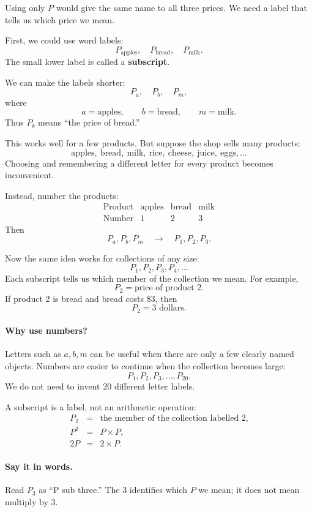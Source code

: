 	Using only $P$ would give the same name to all three prices. We need a label that tells us which price we mean.
	
	First, we could use word labels:
	\[
	P_{\text{apples}},\quad
	P_{\text{bread}},\quad
	P_{\text{milk}}.
	\]
	The small lower label is called a \textbf{subscript}.
	
	We can make the labels shorter:
	\[
	P_a,\quad P_b,\quad P_m,
	\]
	where
	\[
	a=\text{apples},\qquad
	b=\text{bread},\qquad
	m=\text{milk}.
	\]
	Thus $P_b$ means ``the price of bread.''
	
	This works well for a few products. But suppose the shop sells many products:
	\[
	\text{apples},\ \text{bread},\ \text{milk},\ \text{rice},\
	\text{cheese},\ \text{juice},\ \text{eggs},\ldots
	\]
	Choosing and remembering a different letter for every product becomes inconvenient.
	
	Instead, number the products:
	\[
	\begin{array}{c|ccc}
		\text{Product} & \text{apples} & \text{bread} & \text{milk} \\
		\hline
		\text{Number} & 1 & 2 & 3
	\end{array}
	\]
	Then
	\[
	P_a,P_b,P_m
	\quad\longrightarrow\quad
	P_1,P_2,P_3.
	\]
	
	Now the same idea works for collections of any size:
	\[
	P_1,P_2,P_3,P_4,\ldots
	\]
	Each subscript tells us which member of the collection we mean. For example,
	\[
	P_2=\text{price of product 2}.
	\]
	If product 2 is bread and bread costs \$3, then
	\[
	P_2=3\text{ dollars}.
	\]
	
	\paragraph{Why use numbers?}
	Letters such as $a,b,m$ can be useful when there are only a few clearly named objects. Numbers are easier to continue when the collection becomes large:
	\[
	P_1,P_2,P_3,\ldots,P_{20}.
	\]
	We do not need to invent 20 different letter labels.
	
	A subscript is a label, not an arithmetic operation:
	\[
	\begin{array}{ccl}
		P_2 & = & \text{the member of the collection labelled 2},\\
		P^2 & = & P\times P,\\
		2P  & = & 2\times P.
	\end{array}
	\]
	
	\paragraph{Say it in words.}
	Read $P_3$ as ``P sub three.'' The 3 identifies which $P$ we mean; it does not mean multiply by 3.
	
